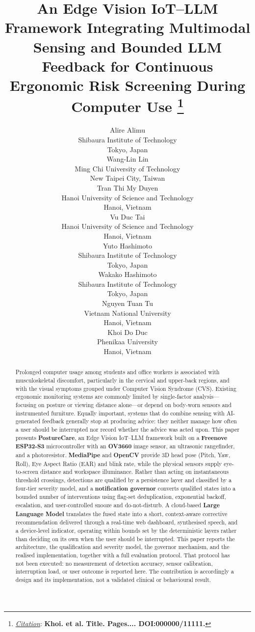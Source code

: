 \documentclass{article}
\title{An Edge Vision IoT--LLM Framework Integrating Multimodal Sensing and Bounded LLM Feedback for Continuous Ergonomic Risk Screening During Computer Use
\thanks{\textit{\underline{Citation}}:
\textbf{Khoi. et al. Title. Pages.... DOI:000000/11111.}}
}
\author{
  Alire Alimu \\
  Shibaura Institute of Technology \\
  Tokyo, Japan \\
  \And
  Wang-Lin Lin \\
  Ming Chi University of Technology \\
  New Taipei City, Taiwan \\
  \AND
  Tran Thi My Duyen \\
  Hanoi University of Science and Technology \\
  Hanoi, Vietnam \\
  \And
  Vu Duc Tai \\
  Hanoi University of Science and Technology \\
  Hanoi, Vietnam \\
  \AND
  Yuto Hashimoto \\
  Shibaura Institute of Technology \\
  Tokyo, Japan \\
  \And
  Wakako Hashimoto \\
  Shibaura Institute of Technology \\
  Tokyo, Japan \\
  \AND
  Nguyen Tuan Tu \\
  Vietnam National University \\
  Hanoi, Vietnam \\
  \And
  Khoi Do Duc \\
  Phenikaa University \\
  Hanoi, Vietnam \\
}
\begin{document}
\maketitle

\begin{abstract}
Prolonged computer usage among students and office workers is associated with musculoskeletal discomfort, particularly in the cervical and upper-back regions, and with the visual symptoms grouped under Computer Vision Syndrome (CVS). Existing ergonomic monitoring systems are commonly limited by single-factor analysis---focusing on posture or viewing distance alone---or depend on body-worn sensors and instrumented furniture. Equally important, systems that do combine sensing with AI-generated feedback generally stop at producing advice: they neither manage how often a user should be interrupted nor record whether the advice was acted upon. This paper presents \textbf{PostureCare}, an Edge Vision IoT--LLM framework built on a \textbf{Freenove ESP32-S3} microcontroller with an \textbf{OV3660} image sensor, an ultrasonic rangefinder, and a photoresistor. \textbf{MediaPipe} and \textbf{OpenCV} provide 3D head pose (Pitch, Yaw, Roll), Eye Aspect Ratio (EAR) and blink rate, while the physical sensors supply eye-to-screen distance and workspace illuminance. Rather than acting on instantaneous threshold crossings, detections are qualified by a persistence layer and classified by a four-tier severity model, and a \textbf{notification governor} converts qualified states into a bounded number of interventions using flag-set deduplication, exponential backoff, escalation, and user-controlled snooze and do-not-disturb. A cloud-based \textbf{Large Language Model} translates the fused state into a short, context-aware corrective recommendation delivered through a real-time web dashboard, synthesised speech, and a device-level indicator, operating within bounds set by the deterministic layers rather than deciding on its own when the user should be interrupted. This paper reports the architecture, the qualification and severity model, the governor mechanism, and the realised implementation, together with a full evaluation protocol. That protocol has not been executed: no measurement of detection accuracy, sensor calibration, interruption load, or user outcome is reported here. The contribution is accordingly a design and its implementation, not a validated clinical or behavioural result.
\end{abstract}


\end{document}
